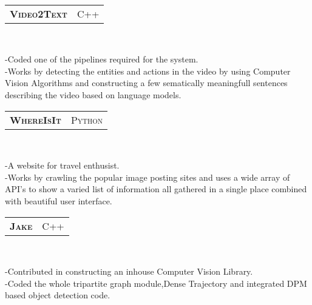 \documentclass[10pt,a4paper,oneside]{article}
\begin{document}
\begin{minipage}[t]{0.63\textwidth}
        \vspace{10pt}\\
        \begin{tabular}{c|c}
            \textbf{\normalsize V\textsc{ideo}2T\textsc{ext}}
            &\textmd{\normalsize C\textsc{++}}
        \end{tabular}\\
         \vspace{-4mm}
        \begin{adjustwidth}{7pt}{0pt}
        {\footnotesize -Coded one of the pipelines required
        for the system.\\
        -Works by detecting the entities and actions in the
        video by using Computer Vision Algorithms and constructing a few
        sematically meaningfull sentences describing the video
        based on language models.}\\
        \end{adjustwidth}
        \begin{tabular}{c|c}
            \textbf{\normalsize W\textsc{here}I\textsc{s}I\textsc{t}}
            &\textmd{\normalsize P\textsc{ython}}
        \end{tabular}\\
         \vspace{-4mm}
        \begin{adjustwidth}{7pt}{0pt}
        {\footnotesize -A website for travel
        enthusist.\\
        -Works by crawling the popular image posting sites and
        uses a wide array of API's to show a varied list of
        information all gathered in a single place combined with
        beautiful user interface. }\\
        \end{adjustwidth}
        \begin{tabular}{c|c}
            \textbf{\normalsize J\textsc{ake}}
            &\textmd{\normalsize C\textsc{++}}
        \end{tabular}\\
         \vspace{-4mm}
        \begin{adjustwidth}{7pt}{0pt}
        {\footnotesize -Contributed in constructing an inhouse
        Computer Vision Library.\\
        -Coded the whole tripartite graph module,Dense
    Trajectory and integrated DPM based object detection code.}\\
        \end{adjustwidth}

\end{minipage}
\end{document}
